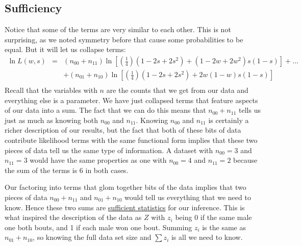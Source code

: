 \documentclass[11pt]{article}
\begin{document}
\subsection{Sufficiency}
Notice that some of the terms are very similar to each other. This is not surprising, as we noted symmetry before that cause some probabilities to be equal. But it will let us collapse terms:
\begin{eqnarray*} 
\ln L(w,s) & = & (n_{00} + n_{11})\ln\left[\left(\frac{1}{4}\right)(1-2s +2s^2) + (1 -2w +2w^2) s(1-s)\right] + \ldots \\
	& & +  (n_{01}+n_{10})\ln\left[\left(\frac{1}{4}\right)(1-2s +2s^2) + 2w(1-w) s(1-s)\right] \\
\end{eqnarray*}
Recall that the variables with $n$ are the counts that we get from our data and everything else is a parameter.
We have just collapsed terms that feature aspects of our data into a sum.
The fact that we can do this means that $n_{00} + n_{11}$ tells us just as much as knowing both $n_{00}$ and $n_{11}$.
Knowing $n_{00}$ and $n_{11}$ is certainly a richer description of our results, but the fact that both of these bits of data contribute likelihood terms with the same functional form implies that these two pieces of data tell us the same type of information.
A dataset with $n_{00}=3$ and $n_{11}=3$ would have the same properties as one with $n_{00}=4$ and $n_{11}=2$ because the sum of the terms is 6 in both cases.

Our factoring into terms that glom together bits of the data implies that two pieces of data $n_{00} + n_{11}$ and $n_{01} + n_{10}$ would tell us everything that we need to know.
Hence these two sums are \href{http://en.wikipedia.org/wiki/Sufficiency_%28statistics%29}{sufficient statistics} for our inference.
This is what inspired the description of the data as $Z$ with $z_i$ being 0 if the same male one both bouts, and 1 if each male won one bout.
Summing $z_i$ is the same as $n_{01}+n_{10}$, so knowing the full data set size and $\sum z_i$ is all we need to know.
\end{document}
